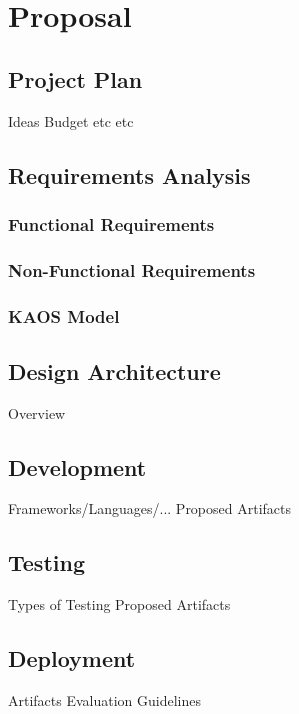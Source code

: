 
%

\chapter{Proposal}
\label{cha:proposal}

\section{Project Plan}
    Ideas
    Budget
    etc etc
    
\section{Requirements Analysis}

\subsection{Functional Requirements}

\subsection{Non-Functional Requirements}

\subsection{KAOS Model}
  
\section{Design Architecture}
    Overview

\section{Development}
    Frameworks/Languages/...
    Proposed Artifacts
    
\section{Testing}
    Types of Testing
    Proposed Artifacts
    
\section{Deployment}
    Artifacts
    Evaluation Guidelines

